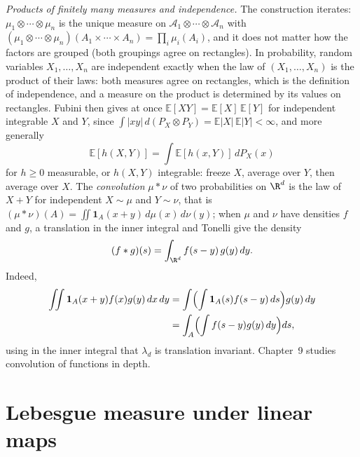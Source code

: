\emph{Products of finitely many measures and independence.} The construction iterates: $\mu_1\otimes\cdots\otimes\mu_n$ is the unique measure on $\mathcal A_1\otimes\cdots\otimes\mathcal A_n$ with
$(\mu_1\otimes\cdots\otimes\mu_n)(A_1\times\cdots\times A_n)=\prod_i\mu_i(A_i)$, and it does not matter how the factors are grouped (both groupings agree on rectangles). In probability, random variables
$X_1,\dots,X_n$ are independent exactly when the law of $(X_1,\dots,X_n)$ is the product of their laws: both measures agree on rectangles, which is the definition of independence, and a measure on
the product is determined by its values on rectangles. Fubini then gives at once $\mathbb E[XY]=\mathbb E[X]\,\mathbb E[Y]$ for independent integrable $X$ and $Y$, since
$\int|xy|\,d(P_X\otimes P_Y)=\mathbb E|X|\,\mathbb E|Y|<\infty$, and more generally
\[\mathbb E[h(X,Y)]=\int\mathbb E[h(x,Y)]\,dP_X(x)\]
for $h\ge0$ measurable, or $h(X,Y)$ integrable: freeze $X$, average over $Y$, then average over $X$. The \emph{convolution} $\mu*\nu$ of two probabilities on $\R^d$ is the law of $X+Y$ for
independent $X\sim\mu$ and $Y\sim\nu$, that is $(\mu*\nu)(A)=\iint\mathbf 1_A(x+y)\,d\mu(x)\,d\nu(y)$; when $\mu$ and $\nu$ have densities $f$ and $g$, a translation in the inner integral and Tonelli
give the density
\[(f*g)(s)=\int_{\R^d}f(s-y)\,g(y)\,dy.\]
Indeed, \[\begin{aligned}\iint\mathbf 1_A(x+y)f(x)g(y)\,dx\,dy&=\int\Bigl(\int\mathbf 1_A(s)f(s-y)\,ds\Bigr)g(y)\,dy\\&=\int_A\Bigl(\int f(s-y)g(y)\,dy\Bigr)ds,\end{aligned}\] using in the inner integral that $\lambda_d$ is translation
invariant. Chapter~9 studies convolution of functions in depth.

\section{Lebesgue measure under linear maps}

